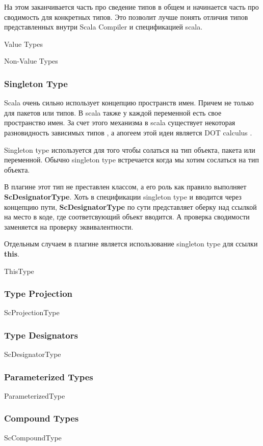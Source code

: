 На этом заканчивается часть про сведение типов в общем и начинается часть про
сводимость для конкретных типов.
Это позволит лучше понять отличия типов представленных внутри Scala Compiler
и спецификацией scala.

Value Types

Non-Value Types

\subsubsection{Singleton Type}
Scala очень сильно использует концепцию пространств имен.
Причем не только для пакетов или типов.
В scala также у каждой переменной есть свое пространство имен.
За счет этого механизма в scala существует некоторая разновидность зависимых
типов \cite{dependent_type}, а апогеем этой идеи является DOT calculus
\cite{dot_calculus}.

Singleton type используется для того чтобы солаться на тип объекта, пакета или
переменной.
Обычно singleton type встречается когда мы хотим сослаться на тип объекта.

В плагине этот тип не преставлен классом, а его роль как правило выполняет
\textbf{ScDesignatorType}.
Хоть в спецификации singleton type и вводится через концепцию пути,
\textbf{ScDesignatorType} по сути представляет оберку над ссылкой на место в коде,
где соответсвующий объект вводится.
А проверка сводимости заменяется на проверку эквивалентности.

Отдельным случаем в плагине является использование singleton type для ссылки
\textbf{this}.

ThisType


\subsubsection{Type Projection}
ScProjectionType

\subsubsection{Type Designators}
ScDesignatorType

\subsubsection{Parameterized Types}
ParameterizedType

\subsubsection{Compound Types}
ScCompoundType

